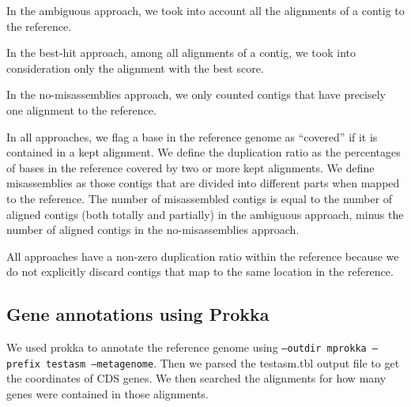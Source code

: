 \documentclass[10pt,a4paper,twocolumn]{article}
\begin{document}



In the ambiguous approach, we took into account all the alignments of
a contig to the reference.

In the best-hit approach, among all alignments of a contig, we took
into consideration only the alignment with the best score.

In the no-misassemblies approach, we only counted contigs that have
precisely one alignment to the reference.

In all approaches, we flag a base in the reference genome as
``covered'' if it is contained in a kept alignment.  We define the
duplication ratio as the percentages of bases in the reference covered
by two or more kept alignments. We define misassemblies as
those contigs that are divided into different parts when mapped to the
reference.  The number of misassembled contigs is equal to the number
of aligned contigs (both totally and partially) in the ambiguous
approach, minus the number of aligned contigs in the no-misassemblies
approach.


All approaches have a non-zero duplication ratio within the reference
because we do not explicitly discard contigs that map to the same
location in the reference.


\subsection*{Gene annotations using Prokka}
We used prokka \cite{prokka} to annotate the reference genome using
{\tt{--outdir mprokka --prefix testasm --metagenome}}. Then we parsed
the testasm.tbl output file to get the coordinates of CDS genes. We then
searched the alignments for how many genes were contained in those
alignments.
\end{document}
